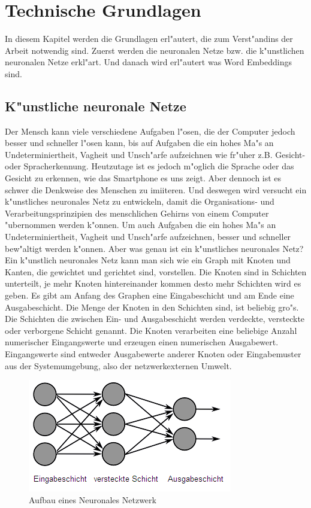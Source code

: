 \chapter{Technische Grundlagen}
In diesem Kapitel werden die Grundlagen erl"autert, die zum Verst"andins der Arbeit notwendig sind.
Zuerst werden die neuronalen Netze bzw. die k"unstlichen neuronalen Netze erkl"art.
Und danach wird erl"autert was Word Embeddings sind.

\section{K"unstliche neuronale Netze}
Der Mensch kann viele verschiedene Aufgaben l"osen, die der Computer jedoch besser und schneller l"osen kann, bis auf Aufgaben die ein hohes Ma"s an Undeterminiertheit, Vagheit und Unsch"arfe aufzeichnen wie fr"uher z.B. Gesicht- oder Spracherkennung. Heutzutage ist es jedoch m"oglich die Sprache oder das Gesicht zu erkennen, wie das Smartphone es uns zeigt. Aber dennoch ist es schwer die Denkweise des Menschen zu imiiteren. Und deswegen wird versucht ein k"unstliches neuronales Netz zu entwickeln, damit die Organisations- und Verarbeitungsprinzipien des menschlichen Gehirns von einem Computer "ubernommen werden k"onnen. Um auch Aufgaben die ein hohes Ma"s an Undeterminiertheit, Vagheit und Unsch"arfe aufzeichnen, besser und schneller bew"altigt werden k"onnen. Aber was genau ist ein k"unstliches neuronales Netz? 
Ein k"unstlich neuronales Netz kann man sich wie ein Graph mit Knoten und Kanten, die gewichtet und gerichtet sind, vorstellen. Die Knoten sind in Schichten unterteilt, je mehr Knoten hintereinander kommen desto mehr Schichten wird es geben. Es gibt am Anfang des Graphen eine Eingabeschicht und am Ende eine Ausgabeschicht. Die Menge der Knoten in den Schichten sind, ist beliebig gro"s. Die Schichten die zwischen Ein- und Ausgabeschicht werden verdeckte, versteckte oder verborgene Schicht genannt. Die Knoten verarbeiten eine beliebige Anzahl numerischer  Eingangswerte und  erzeugen  einen  numerischen Ausgabewert. Eingangswerte  sind  entweder  Ausgabewerte  anderer Knoten oder Eingabemuster aus der Systemumgebung, also der netzwerkexternen Umwelt.\\
\begin{figure}[bth]
\includegraphics{Graphics/neuronales_netz.png}
\caption[Neuronales Netzwerk]{Aufbau eines Neuronales Netzwerk  \cite{todesco:2018}}
\end{figure}\\
